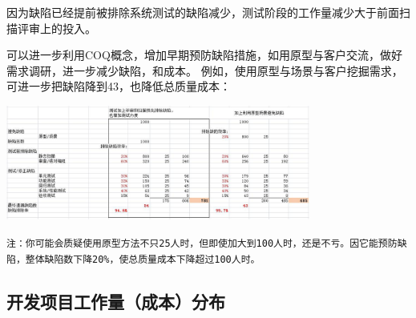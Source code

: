 


因为缺陷已经提前被排除系统测试的缺陷减少，测试阶段的工作量减少大于前面扫描评审上的投入。

可以进一步利用COQ概念，增加早期预防缺陷措施，如用原型与客户交流，做好需求调研，进一步减少缺陷，和成本。
例如，使用原型与场景与客户挖掘需求，可进一步把缺陷降到43，也降低总质量成本：


\includegraphics[width=10cm]{est缺陷表3.jpg}

\texttt{注：你可能会质疑使用原型方法不只25人时，但即使加大到100人时，还是不亏。因它能预防缺陷，整体缺陷数下降20\%，使总质量成本下降超过100人时。}

\hypertarget{ux5f00ux53d1ux9879ux76eeux5de5ux4f5cux91cfux6210ux672cux5206ux5e03}{%
\subsection{开发项目工作量（成本）分布}\label{ux5f00ux53d1ux9879ux76eeux5de5ux4f5cux91cfux6210ux672cux5206ux5e03}}

